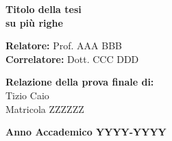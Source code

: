 \begin{titlepage}
		\vspace{10mm}
        
		\begin{center}
			\Huge{
				\textbf{Titolo della tesi \\ su più righe \\}
				}
		\end{center}
        
        \vspace{40mm}

        \begin{flushleft}
        

        \noindent
        {\large \textbf{Relatore:} Prof. AAA BBB } \\

        \noindent
        {\large \textbf{Correlatore:} Dott. CCC DDD}
        \end{flushleft}
        
        \vspace{10mm}

        \begin{flushright}
            {\large \textbf{Relazione della prova finale di:}} \\
            \large{Tizio Caio} \\
            \large{Matricola ZZZZZZ} 
        \end{flushright}
        
        \vspace{10mm}
        \begin{center}
            {\large{\bf Anno Accademico YYYY-YYYY}}
        \end{center}

        \restoregeometry
        
    \end{titlepage}
   